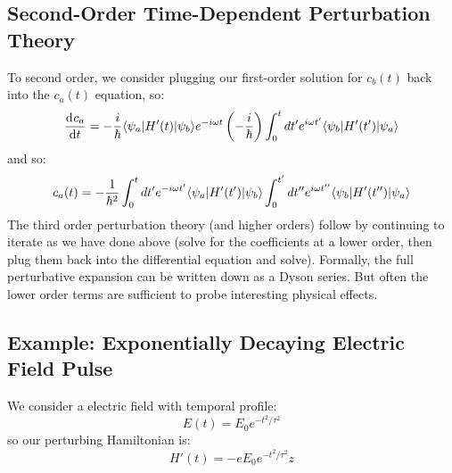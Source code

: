 \subsection{Second-Order Time-Dependent Perturbation Theory}
To second order, we consider plugging our first-order solution for $c_b(t)$ back into the $c_a(t)$ equation, so:
\begin{equation}
    \dod{c_a}{t} = -\frac{i}{\hbar}\bra{\psi_a}H'(t)\ket{\psi_b}e^{-i\omega t}\left(-\frac{i}{\hbar}\right)\int_0^t dt' e^{i\omega t'}\bra{\psi_b}H'(t')\ket{\psi_a}
\end{equation}
and so:
\begin{equation}
    c_a(t) = -\frac{1}{\hbar^2}\int_0^t dt' e^{-i\omega t'}\langle \psi_a \rvert H'(t')\lvert \psi_b \rangle\int_0^{t'}dt'' e^{i\omega t''}\langle \psi_b \rvert H'(t'')\lvert \psi_a \rangle
\end{equation}
The third order perturbation theory (and higher orders) follow by continuing to iterate as we have done above (solve for the coefficients at a lower order, then plug them back into the differential equation and solve). Formally, the full perturbative expansion can be written down as a Dyson series. But often the lower order terms are sufficient to probe interesting physical effects.

\subsection{Example: Exponentially Decaying Electric Field Pulse}
We consider a electric field with temporal profile:
\begin{equation}
    E(t) = E_0e^{-t^2/\tau^2}
\end{equation}
so our perturbing Hamiltonian is:
\begin{equation}
    H'(t) = -eE_0e^{-t^2/\tau^2}z
\end{equation}

